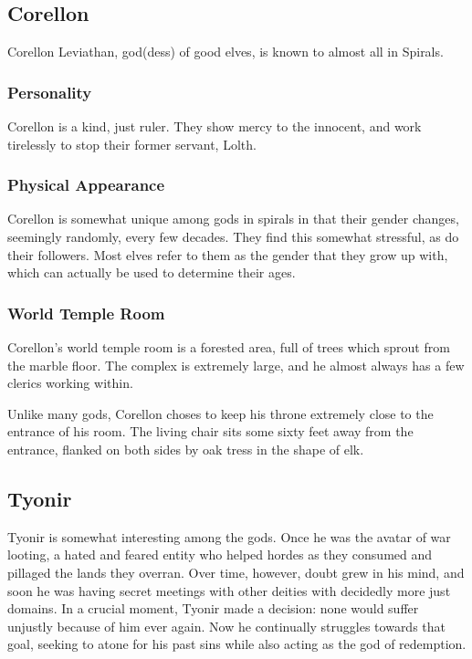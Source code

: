 \subsection*{Corellon}
\begin{goddesc}
\end{goddesc}
Corellon Leviathan, god(dess) of good elves, is known to almost all in Spirals.

\subsubsection*{Personality}
Corellon is a kind, just ruler.
They show mercy to the innocent, and work tirelessly to stop their former servant, Lolth.

\subsubsection*{Physical Appearance}
 Corellon is somewhat unique among gods in spirals in that their gender changes, seemingly randomly, every few decades.
 They find this somewhat stressful, as do their followers.
 Most elves refer to them as the gender that they grow up with, which can actually be used to determine their ages.
 
 \subsubsection*{World Temple Room}
 Corellon's world temple room is a forested area, full of trees which sprout from the marble floor.
 The complex is extremely large, and he almost always has a few clerics working within.
 
 Unlike many gods, Corellon choses to keep his throne extremely close to the entrance of his room.
The living chair sits some sixty feet away from the entrance, flanked on both sides by oak tress in the shape of elk.

\subsection*{Tyonir}
\begin{goddesc}
\end{goddesc}
Tyonir is somewhat interesting among the gods.
Once he was the avatar of war looting, a hated and feared entity who helped hordes as they consumed and pillaged the lands they overran.
Over time, however, doubt grew in his mind, and soon he was having secret meetings with other deities with decidedly more just domains. 
In a crucial moment, Tyonir made a decision: none would suffer unjustly because of him ever again.
Now he continually struggles towards that goal, seeking to atone for his past sins while also acting as the god of redemption.

